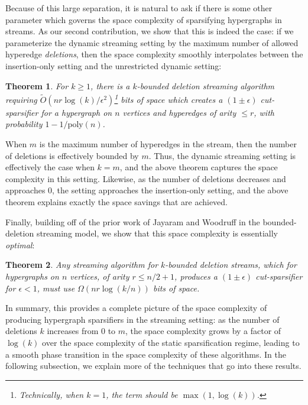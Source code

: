 \documentclass[11pt]{article}
\newtheorem{theorem}{Theorem}[section]
\theoremstyle{definition}
\newcommand{\eps}{\epsilon}
\begin{document}
Because of this large separation, it is natural to ask if there is some other parameter which governs the space complexity of sparsifying hypergraphs in streams. 
As our second contribution, we show that this is indeed the case: if we parameterize the dynamic streaming setting by the maximum number of allowed hyperedge \emph{deletions}, then the space complexity smoothly interpolates between the insertion-only setting and the unrestricted dynamic setting:

\begin{theorem}\label{thm:boundedDeletionintro}
	For $k \geq 1$, there is a $k$-bounded deletion streaming algorithm requiring $\widetilde{O}(n r \log(k) / \eps^2)$\footnote{Technically, when $k = 1$, the term should be $\max(1, \log(k))$.} bits of space which creates a $(1 \pm \eps)$ cut-sparsifier for a hypergraph on $n$ vertices and hyperedges of arity $\leq r$, with probability $1 - 1 / \mathrm{poly}(n)$.
\end{theorem}

When $m$ is the maximum number of hyperedges in the stream, then the number of deletions is effectively bounded by $m$. Thus, the dynamic streaming setting is effectively the case when $k = m$, and the above theorem captures the space complexity in this setting. Likewise, as the number of deletions decreases and approaches $0$, the setting approaches the insertion-only setting, and the above theorem explains exactly the space savings that are achieved.

Finally, building off of the prior work of Jayaram and Woodruff \cite{JW18} in the bounded-deletion streaming model, we show that this space complexity is essentially \emph{optimal}:

\begin{theorem}\label{thm:lowerBoundIntro}
    Any streaming algorithm for $k$-bounded deletion streams, which for hypergraphs on $n$ vertices, of arity $r \leq n/2+1$, produces a $(1 \pm \eps)$ cut-sparsifier for $\eps < 1$, must use $\Omega(n r \log(k/n))$ bits of space.
\end{theorem}

In summary, this provides a complete picture of the space complexity of producing hypergraph sparsifiers in the streaming setting: as the number of deletions $k$ increases from $0$ to $m$, the space complexity grows by a factor of $\log(k)$ over the space complexity of the static sparsification regime, leading to a smooth phase transition in the space complexity of these algorithms. In the following subsection, we explain more of the techniques that go into these results.
\end{document}
